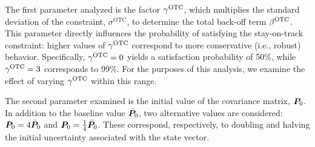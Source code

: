The first parameter analyzed is the factor $\gamma^\textrm{OTC}$, which multiplies the standard deviation of the constraint, $\sigma^\textrm{OTC}$, to determine the total back-off term $\beta^\textrm{OTC}$. This parameter directly influences the probability of satisfying the stay-on-track constraint: higher values of $\gamma^\textrm{OTC}$ correspond to more conservative (i.e., robust) behavior. Specifically, $\gamma^\textrm{OTC} = 0$ yields a satisfaction probability of 50\%, while $\gamma^\textrm{OTC} = 3$ corresponds to 99\%. For the purposes of this analysis, we examine the effect of varying $\gamma^\textrm{OTC}$ within this range. 

The second parameter examined is the initial value of the covariance matrix, $\boldsymbol{P}_0$. In addition to the baseline value $\bar{\boldsymbol{P}}_0$, two alternative values are considered: $\boldsymbol{P}_0 = 4\bar{\boldsymbol{P}}_0$ and $\boldsymbol{P}_0 = \frac{1}{4}\bar{\boldsymbol{P}}_0$. These correspond, respectively, to doubling and halving the initial uncertainty associated with the state vector.

